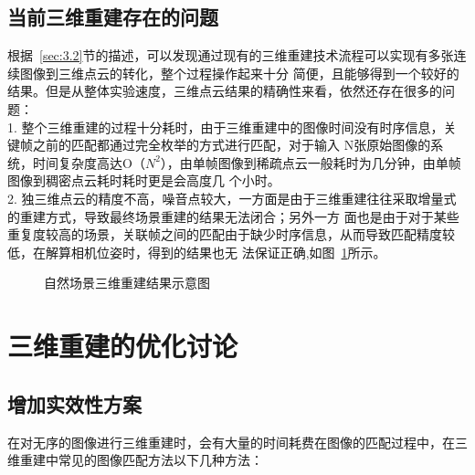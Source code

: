 \subsection{当前三维重建存在的问题}
\label{sec:3.2.3}
根据~\ref{sec:3.2}节的描述，可以发现通过现有的三维重建技术流程可以实现有多张连续图像到三维点云的转化，整个过程操作起来十分
简便，且能够得到一个较好的结果。但是从整体实验速度，三维点云结果的精确性来看，依然还存在很多的问题：\\
1. 整个三维重建的过程十分耗时，由于三维重建中的图像时间没有时序信息，关键帧之前的匹配都通过完全枚举的方式进行匹配，对于输入
N张原始图像的系统，时间复杂度高达O（$N^2$），由单帧图像到稀疏点云一般耗时为几分钟，由单帧图像到稠密点云耗时耗时更是会高度几
个小时。\\
2. 独三维点云的精度不高，噪音点较大，一方面是由于三维重建往往采取增量式的重建方式，导致最终场景重建的结果无法闭合；另外一方
面也是由于对于某些重复度较高的场景，关联帧之间的匹配由于缺少时序信息，从而导致匹配精度较低，在解算相机位姿时，得到的结果也无
法保证正确,如图~\ref{fig:chap2:3dconstr_stone}所示。
\begin{figure}[htbp]
  \centering
  \vskip0.5cm
  \caption{自然场景三维重建结果示意图}\label{fig:chap2:3dconstr_stone}
\end{figure}
\section{三维重建的优化讨论}
\label{sec:3.3}
\subsection{增加实效性方案}
\label{sec:3.3.1}
在对无序的图像进行三维重建时，会有大量的时间耗费在图像的匹配过程中，在三维重建中常见的图像匹配方法以下几种方法：


